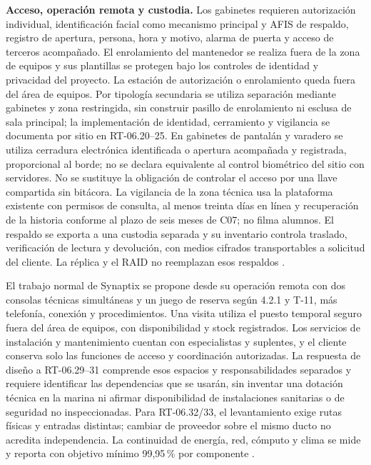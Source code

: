 \textbf{Acceso, operación remota y custodia.} Los gabinetes requieren autorización individual, identificación facial como mecanismo principal y AFIS de respaldo, registro de apertura, persona, hora y motivo, alarma de puerta y acceso de terceros acompañado. El enrolamiento del mantenedor se realiza fuera de la zona de equipos y sus plantillas se protegen bajo los controles de identidad y privacidad del proyecto. La estación de autorización o enrolamiento queda fuera del área de equipos. Por tipología secundaria se utiliza separación mediante gabinetes y zona restringida, sin construir pasillo de enrolamiento ni esclusa de sala principal; la implementación de identidad, cerramiento y vigilancia se documenta por sitio en RT-06.20--25. En gabinetes de pantalán y varadero se utiliza cerradura electrónica identificada o apertura acompañada y registrada, proporcional al borde; no se declara equivalente al control biométrico del sitio con servidores. No se sustituye la obligación de controlar el acceso por una llave compartida sin bitácora. La vigilancia de la zona técnica usa la plataforma existente con permisos de consulta, al menos treinta días en línea y recuperación de la historia conforme al plazo de seis meses de C07; no filma alumnos. El respaldo se exporta a una custodia separada y su inventario controla traslado, verificación de lectura y devolución, con medios cifrados transportables a solicitud del cliente. La réplica y el RAID no reemplazan esos respaldos \parencites[RT-06.20--28, p.~16]{pucv-transversal}[cap.~15, RT-05.10]{caso07}.

El trabajo normal de Synaptix se propone desde su operación remota con dos consolas técnicas simultáneas y un juego de reserva según 4.2.1 y T-11, más telefonía, conexión y procedimientos. Una visita utiliza el puesto temporal seguro fuera del área de equipos, con disponibilidad y stock registrados. Los servicios de instalación y mantenimiento cuentan con especialistas y suplentes, y el cliente conserva solo las funciones de acceso y coordinación autorizadas. La respuesta de diseño a RT-06.29--31 comprende esos espacios y responsabilidades separados y requiere identificar las dependencias que se usarán, sin inventar una dotación técnica en la marina ni afirmar disponibilidad de instalaciones sanitarias o de seguridad no inspeccionadas. Para RT-06.32/33, el levantamiento exige rutas físicas y entradas distintas; cambiar de proveedor sobre el mismo ducto no acredita independencia. La continuidad de energía, red, cómputo y clima se mide y reporta con objetivo mínimo 99,95\,\% por componente \parencites[RT-06.29--33, pp.~16--17; secc.~7.2, pp.~17--18]{pucv-transversal}[art.~16.4, p.~12]{pucv-admin}.

